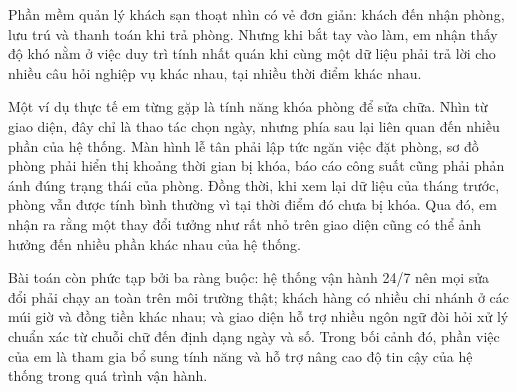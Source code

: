 Phần mềm quản lý khách sạn thoạt nhìn có vẻ đơn giản: khách đến nhận phòng, lưu trú và thanh toán khi trả phòng. Nhưng khi bắt tay vào làm, em nhận thấy độ khó nằm ở việc duy trì tính nhất quán khi cùng một dữ liệu phải trả lời cho nhiều câu hỏi nghiệp vụ khác nhau, tại nhiều thời điểm khác nhau.

Một ví dụ thực tế em từng gặp là tính năng khóa phòng để sửa chữa. Nhìn từ giao diện, đây chỉ là thao tác chọn ngày, nhưng phía sau lại liên quan đến nhiều phần của hệ thống. Màn hình lễ tân phải lập tức ngăn việc đặt phòng, sơ đồ phòng phải hiển thị khoảng thời gian bị khóa, báo cáo công suất cũng phải phản ánh đúng trạng thái của phòng. Đồng thời, khi xem lại dữ liệu của tháng trước, phòng vẫn được tính bình thường vì tại thời điểm đó chưa bị khóa. Qua đó, em nhận ra rằng một thay đổi tưởng như rất nhỏ trên giao diện cũng có thể ảnh hưởng đến nhiều phần khác nhau của hệ thống.

Bài toán còn phức tạp bởi ba ràng buộc: hệ thống vận hành 24/7 nên mọi sửa đổi phải chạy an toàn trên môi trường thật; khách hàng có nhiều chi nhánh ở các múi giờ và đồng tiền khác nhau; và giao diện hỗ trợ nhiều ngôn ngữ đòi hỏi xử lý chuẩn xác từ chuỗi chữ đến định dạng ngày và số. Trong bối cảnh đó, phần việc của em là tham gia bổ sung tính năng và hỗ trợ nâng cao độ tin cậy của hệ thống trong quá trình vận hành.
